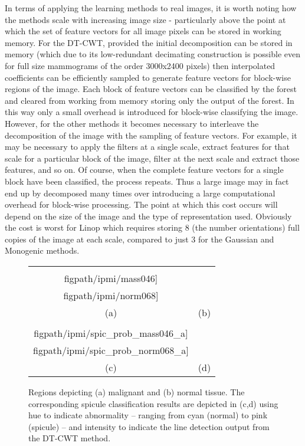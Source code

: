 In terms of applying the learning methods to real images, it is worth noting how the methods scale with increasing image size - particularly above the point at which the set of feature vectors for all image pixels can be stored in working memory. For the DT-CWT, provided the initial decomposition can be stored in memory (which due to its low-redundant decimating construction is possible even for full size mammograms of the order 3000x2400 pixels) then interpolated coefficients can be efficiently sampled to generate feature vectors for block-wise regions of the image. Each block of feature vectors can be classified by the forest and cleared from working from memory storing only the output of the forest. In this way only a small overhead is introduced for block-wise classifying the image. However, for the other methods it becomes necessary to interleave the decomposition of the image with the sampling of feature vectors. For example, it may be necessary to apply the filters at a single scale, extract features for that scale for a particular block of the image, filter at the next scale and extract those features, and so on. Of course, when the complete feature vectors for a single block have been classified, the process repeats. Thus a large image may in fact end up by decomposed many times over introducing a large computational overhead for block-wise processing. The point at which this cost occurs will depend on the size of the image and the type of representation used. Obviously the cost is worst for Linop which requires storing 8 (\ie the number orientations) full copies of the image at each scale, compared to just 3 for the Gaussian and Monogenic methods.


\begin{figure}
\centering
\begin{tabular}{c c}
\texttt{[image: \\figpath/ipmi/mass046]} &
\texttt{[image: \\figpath/ipmi/norm068]} \\
(a) & (b) \\
\texttt{[image: \\figpath/ipmi/spic\_prob\_mass046\_a]} &
\texttt{[image: \\figpath/ipmi/spic\_prob\_norm068\_a]} \\
(c) & (d)
\end{tabular}
%
\caption{Regions depicting (a) malignant and (b) normal tissue. The corresponding spicule classification results are depicted in (c,d) using hue to indicate abnormality -- ranging from cyan (normal) to pink (spicule) -- and intensity to indicate the line detection output from the DT-CWT method.}
\label{f:mammogram_examples}
\end{figure}


